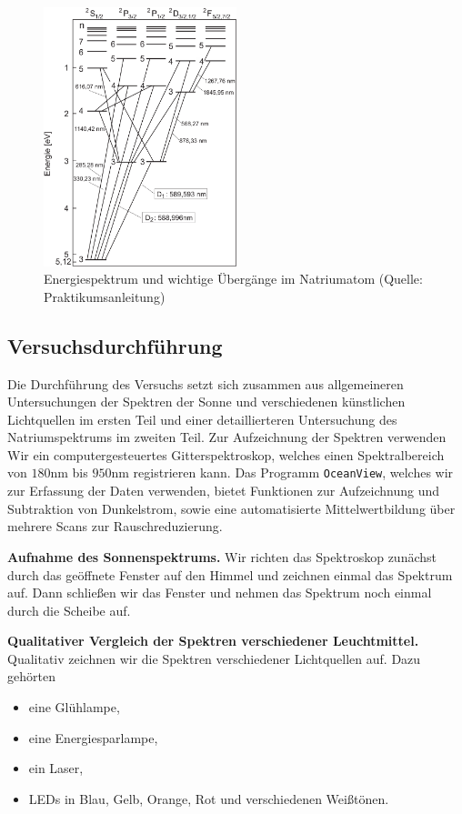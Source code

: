 \begin{figure}[H]
  \centering
  \includegraphics[width=0.5\textwidth]{files/uebergaenge.png}
  \caption{Energiespektrum und wichtige Übergänge im Natriumatom (Quelle: Praktikumsanleitung)}
  \label{fig:uebergaenge}
\end{figure}

\newpage

\subsection{Versuchsdurchführung}

Die Durchführung des Versuchs setzt sich zusammen aus allgemeineren Untersuchungen der Spektren der Sonne und verschiedenen künstlichen Lichtquellen im ersten Teil und einer detaillierteren Untersuchung des Natriumspektrums im zweiten Teil. Zur Aufzeichnung der Spektren verwenden Wir ein computergesteuertes Gitterspektroskop, welches einen Spektralbereich von $180\si{\nano\meter}$ bis $950\si{\nano\meter}$ registrieren kann. Das Programm \texttt{OceanView}, welches wir zur Erfassung der Daten verwenden, bietet Funktionen zur Aufzeichnung und Subtraktion von Dunkelstrom, sowie eine automatisierte Mittelwertbildung über mehrere Scans zur Rauschreduzierung.

\textbf{Aufnahme des Sonnenspektrums.} Wir richten das Spektroskop zunächst durch das geöffnete Fenster auf den Himmel und zeichnen einmal das Spektrum auf. Dann schließen wir das Fenster und nehmen das Spektrum noch einmal durch die Scheibe auf.

\textbf{Qualitativer Vergleich der Spektren verschiedener Leuchtmittel.} Qualitativ zeichnen wir die Spektren verschiedener Lichtquellen auf. Dazu gehörten
\begin{itemize}
  \item eine Glühlampe,
  \item eine Energiesparlampe,
  \item ein Laser,
  \item LEDs in Blau, Gelb, Orange, Rot und verschiedenen Weißtönen.
\end{itemize}

